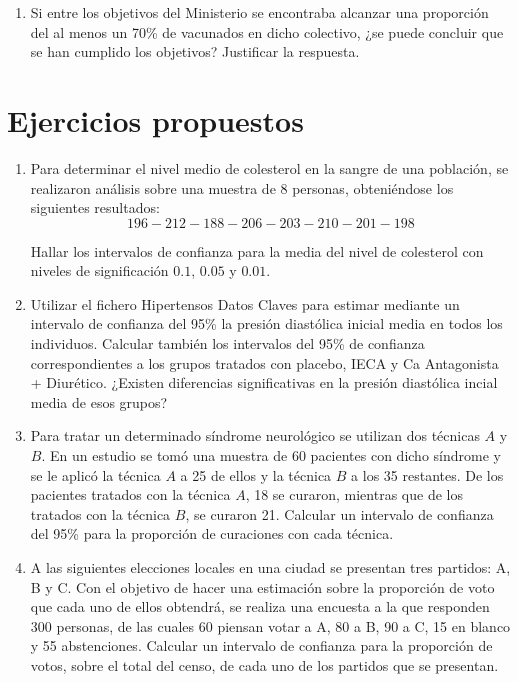 \begin{enumerate}[leftmargin=*]
\begin{enumerate}
\item Si entre los objetivos del Ministerio se encontraba alcanzar una proporción del al menos un 70\% de vacunados en
dicho colectivo, ¿se puede concluir que se han cumplido los objetivos? Justificar la respuesta.
\end{enumerate}
\end{enumerate}


\section{Ejercicios propuestos}
\begin{enumerate}[leftmargin=*] \item  Para determinar el nivel medio de colesterol en la sangre de una población, se
realizaron análisis sobre una muestra de 8 personas, obteniéndose los siguientes resultados: \[
196-212-188-206-203-210-201-198 \]

Hallar los intervalos de confianza para la media del nivel de colesterol con niveles de significación $0.1$, $0.05$ y
$0.01$.

\item Utilizar el fichero \textsf{Hipertensos Datos Claves} para estimar mediante un intervalo de confianza del 95\% la
presión diastólica inicial media en todos los individuos. Calcular también los intervalos del 95\% de confianza
correspondientes a los grupos tratados con placebo, IECA y Ca Antagonista + Diurético. ¿Existen diferencias
significativas en la presión diastólica incial media de esos grupos?

\item Para tratar un determinado síndrome neurológico se utilizan dos técnicas $A$ y $B$. En un estudio se tomó una
muestra de 60 pacientes con dicho síndrome y se le aplicó la técnica $A$ a 25 de ellos y la técnica $B$ a los 35
restantes. De los pacientes tratados con la técnica $A$, 18 se curaron, mientras que de los tratados con la técnica $B$,
se curaron 21. Calcular un intervalo de confianza del 95\% para la proporción de curaciones con cada técnica.

\item A las siguientes elecciones locales en una ciudad se presentan tres partidos: A, B y C. Con el objetivo de hacer
una estimación sobre la proporción de voto que cada uno de ellos obtendrá, se realiza una encuesta a la que responden
300 personas, de las cuales 60 piensan votar a A, 80 a B, 90 a C, 15 en blanco y 55 abstenciones. Calcular un intervalo
de confianza para la proporción de votos, sobre el total del censo, de cada uno de los partidos que se presentan.
\end{enumerate}
